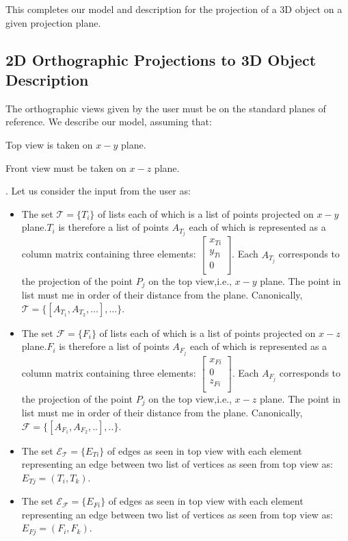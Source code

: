 \documentclass[12pt]{report}
\begin{document}
This completes our model and description for the projection of a 3D object on a given projection plane.
\newpage
\subsection*{2D Orthographic Projections to 3D Object Description}
The orthographic views given by the user must be on the standard planes of reference. We describe our model, assuming that: 
\begin{enumerate*}
\item Top view is taken on \(x-y\) plane.
\item Front view must be taken on \(x-z\) plane.
\end{enumerate*}. Let us consider the input from the user as:
\begin{itemize}[nolistsep, noitemsep]
\item The set \(\mathcal{T} = \{T_{i}\} \) of lists each of which is a list of points projected on \(x-y\) plane.\(T_{i}\) is therefore a list of points \(A_{T_{j}}\)  each of which is represented as a column matrix containing three elements: \(\begin{bmatrix} x_{T i} \\ y_{Ti}  \\ 0 \\ \end{bmatrix}\). Each \(A_{T_{j}}\) corresponds to the projection of the point \(P_{j}\) on the top view,i.e., \(x-y\) plane. The point in list must me in order of their distance from the plane. Canonically, \(\mathcal{T} = \{[A_{T_{1}},A_{T_{2}},\dots],\dots \} \).
\item The set \(\mathcal{F} = \{F_{i}\} \) of lists each of which is a list of points projected on \(x-z\) plane.\(F_{i}\) is therefore a list of points \(A_{F_{j}}\)  each of which is represented as a column matrix containing three elements: \(\begin{bmatrix} x_{F i} \\ 0  \\ z_{F i} \\ \end{bmatrix}\). Each \(A_{F_{j}}\) corresponds to the projection of the point \(P_{j}\) on the top view,i.e., \(x-z\) plane. The point in list must me in order of their distance from the plane. Canonically, \(\mathcal{F} = \{[A_{F_{1}},A_{F_{2}},..],.. \} \).
\item The set \(\mathcal{E_{T}} = \{E_{T i}\}\) of edges as seen in top view with each element representing an edge between two list of vertices as seen from top view as: \(E_{T j} = (T_{i}, T_{k})\).
\item The set \(\mathcal{E_{F}} = \{E_{F i}\}\) of edges as seen in top view with each element representing an edge between two list of vertices as seen from top view as: \(E_{F j} = (F_{i}, F_{k})\).
\end{itemize} 
\end{document}
